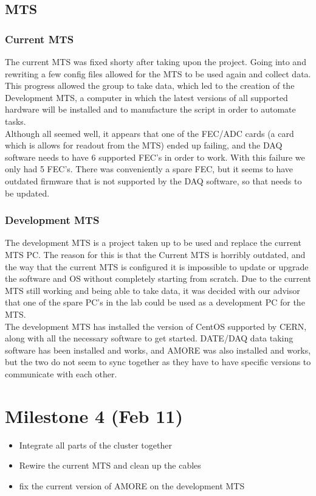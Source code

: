 \documentclass[12pt]{article}
\newcommand\tab[1][1cm]{\hspace*{#1}}
\begin{document}
\subsection{MTS}
\subsubsection{Current MTS}
\tab The current MTS was fixed shorty after taking upon the project. Going into and rewriting a few config files allowed for the MTS to be used again and collect data. This progress allowed the group to take data, which led to the creation of the Development MTS, a computer in which the latest versions of all supported hardware will be installed and to manufacture the script in order to automate tasks. \\
\tab Although all seemed well, it appears that one of the FEC/ADC cards (a card which is allows for readout from the MTS) ended up failing, and the DAQ software needs to have 6 supported FEC's in order to work. With this failure we only had 5 FEC's. There was conveniently a spare FEC, but it seems to have outdated firmware that is not supported by the DAQ software, so that needs to be updated. 
\subsubsection{Development MTS}
\tab The development MTS is a project taken up to be used and replace the current MTS PC. The reason for this is that the Current MTS is horribly outdated, and the way that the current MTS is configured it is impossible to update or upgrade the software and OS without completely starting from scratch. Due to the current MTS still working and being able to take data, it was decided with our advisor that one of the spare PC's in the lab could be used as a development PC for the MTS. \\
\tab The development MTS has installed the version of CentOS supported by CERN, along with all the necessary software to get started. DATE/DAQ data taking software has been installed and works, and AMORE was also installed and works, but the two do not seem to sync together as they have to have specific versions to communicate with each other.


\section{Milestone 4 (Feb 11)}
\begin{itemize}
	\item Integrate all parts of the cluster together
	\item Rewire the current MTS and clean up the cables 
	\item fix the current version of AMORE on the development MTS
\end{itemize}
\end{document}
